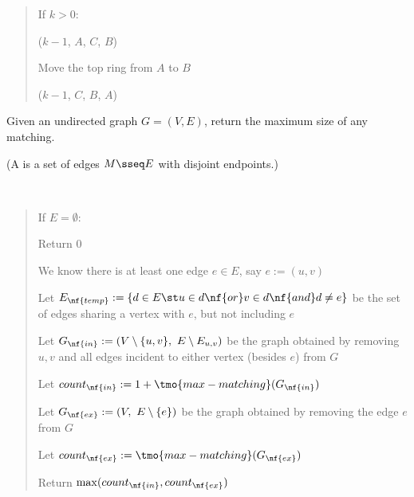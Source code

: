 \documentclass[10pt]{article}
\begin{document}
\begin{solution}
\begin{quote}
%

\begin{steps}
  \item If $k > 0$:
    \begin{steps}
    \item {}($k-1$, $A$, $C$, $B$)
    \item Move the top ring from $A$ to $B$
    \item {}($k-1$, $C$, $B$, $A$)
    \end{steps}
\end{steps}
\end{quote}
\end{solution}
\pagebreak

Given an undirected graph $ G = (V, E) $, return the maximum size of any matching.

(A  is a set of edges $M \sseq E$ with disjoint endpoints.)

\begin{solution}\ %
\begin{quote}%
\noindent{}%

%

\begin{steps}
  \item If $E = \emptyset$:
    \begin{steps}
    \item Return 0
    \end{steps}
  \item We know there is at least one edge $ e \in E $, say $ e := (u, v) $
  \item Let $ E_{\nf{temp}} := \{d\in E \st u\in d \nf{ or } v\in d \nf{ and } d\neq e\} $ be the set of edges sharing a vertex with $ e $, but not including $ e $
  \item Let $ G_{\nf{in}} := (V\setminus \{u,v\},\ E\setminus E_{u,v})$ be the graph obtained by removing  $ u,v $ and all edges incident to either vertex (besides $ e $) from $ G $
  \item Let $ count_{\nf{in}} := 1+\tmo{max-matching}(G_{\nf{in}})$ 
  \item Let $ G_{\nf{ex}} := (V,\ E\setminus\{e\}) $ be the graph obtained by removing the edge $ e $ from $ G $
  \item Let $ count_{\nf{ex}} := \tmo{max-matching}(G_{\nf{ex}}) $ 
  \item Return $\max(count_{\nf{in}}, count_{\nf{ex}})$
\end{steps}
\end{quote}%
\end{solution}%
\pagebreak
\end{document}
